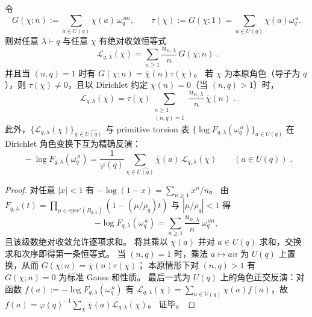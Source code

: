 \begin{theorem}\label{thm:pom-schur-dirichlet-factorization}
令
\[
G(\chi;n):=\sum_{a\in U(q)}\chi(a)\,\omega_q^{\,an},
\qquad
\tau(\chi):=G(\chi;1)=\sum_{a\in U(q)}\chi(a)\omega_q^{\,a}.
\]
则对任意 \(\lambda\vdash q\) 与任意 \(\chi\) 有绝对收敛恒等式
\[
\boxed{\;
\mathcal{L}_{q,\lambda}(\chi)
=
\sum_{n\ge1}\frac{u_{n,\lambda}}{n}\,G(\chi;n)\; }.
\]
并且当 \((n,q)=1\) 时有 \(G(\chi;n)=\overline{\chi}(n)\tau(\chi)\)。
若 \(\chi\) 为本原角色（导子为 \(q\)），则 \(\tau(\chi)\neq0\)，且以 Dirichlet 约定 \(\chi(n)=0\)（当 \((n,q)>1\)）时，
\[
\boxed{\;
\mathcal{L}_{q,\lambda}(\chi)
=
\tau(\chi)\sum_{\substack{n\ge1\\(n,q)=1}}\frac{u_{n,\lambda}}{n}\,\overline{\chi}(n)\; }.
\]
此外，\(\{\mathcal{L}_{q,\lambda}(\chi)\}_{\chi\in\widehat{U(q)}}\) 与 primitive torsion 表 \(\{\log F_{q,\lambda}(\omega_q^{\,a})\}_{a\in U(q)}\) 在 Dirichlet 角色变换下互为精确反演：
\[
\boxed{\;
-\log F_{q,\lambda}(\omega_q^{\,a})
=
\frac{1}{\varphi(q)}\sum_{\chi\in\widehat{U(q)}}\overline{\chi}(a)\,\mathcal{L}_{q,\lambda}(\chi)
\qquad(a\in U(q))\; }.
\]
\end{theorem}
\begin{proof}
对任意 \(|x|<1\) 有 \(-\log(1-x)=\sum_{n\ge1}x^n/n\)。
由 \(F_{q,\lambda}(t)=\prod_{\mu\in\mathrm{spec}'(B_{q,\lambda})}(1-(\mu/\rho_q)t)\) 与 \(|\mu/\rho_q|<1\) 得
\[
-\log F_{q,\lambda}(\omega_q^{\,a})
=
\sum_{n\ge1}\frac{u_{n,\lambda}}{n}\,\omega_q^{\,an},
\]
且该级数绝对收敛允许逐项求和。
将其乘以 \(\chi(a)\) 并对 \(a\in U(q)\) 求和，交换求和次序即得第一条恒等式。
当 \((n,q)=1\) 时，乘法 \(a\mapsto an\) 为 \(U(q)\) 上置换，从而 \(G(\chi;n)=\overline{\chi}(n)\tau(\chi)\)；
本原情形下对 \((n,q)>1\) 有 \(G(\chi;n)=0\) 为标准 Gauss 和性质。
最后一式为 \(U(q)\) 上的角色正交反演：对函数
\(
f(a):=-\log F_{q,\lambda}(\omega_q^{\,a})
\)
有 \(\mathcal{L}_{q,\lambda}(\chi)=\sum_{a\in U(q)}\chi(a)f(a)\)，故
\(
f(a)=\varphi(q)^{-1}\sum_{\chi}\overline{\chi}(a)\mathcal{L}_{q,\lambda}(\chi)
\)。
证毕。
\end{proof}

